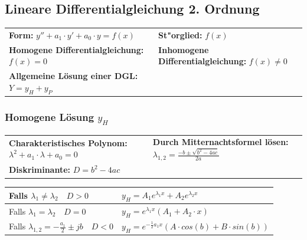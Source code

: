 \subsection{Lineare Differentialgleichung 2. Ordnung}
\renewcommand{\arraystretch}{1.2}
\begin{tabular}{p{8cm}p{8cm}}
	\textbf{Form:} $y''+a_1\cdot y'+a_0\cdot y=f(x)$  &
	\textbf{St"orglied:} $f(x)$\\
	\textbf{Homogene Differentialgleichung:} $f(x)=0$ &
	\textbf{Inhomogene Differentialgleichung:} $f(x)\neq 0$\\
	\textbf{Allgemeine Lösung einer DGL: }	$Y=y_H+y_P$& \\
\end{tabular}

\subsubsection{Homogene Lösung $y_H$}
\begin{tabular}{p{8cm}p{8cm}}
	\textbf{Charakteristisches Polynom:}\newline
	$\lambda^2+a_1\cdot\lambda+a_0=0$&	
	\textbf{Durch Mitternachtsformel lösen: }\newline
	$\lambda_{1,2}={\frac {-b\pm {\sqrt {b^{2}-4ac}}}{2a}}$\\
	\textbf{Diskriminante: }\newline
	$D = b^2-4ac $&\\
\end{tabular}

\begin{tabular}{|p{6cm}|p{8cm}|}
	\hline
	Falls $ \lambda_1\neq \lambda_2 \quad D > 0$&
	$y_H=A_1e^{\lambda_1x}+A_2e^{\lambda_2x}$\\
	\hline
	Falls $\lambda_1= \lambda_2 \quad D = 0$&
	$y_H=e^{\lambda_1x}(A_1+A_2\cdot x)$\\
	\hline
	Falls $\lambda_{1,2}= -\frac{a_1}{2} \pm jb \quad D < 0$&
	$y_H=e^{-\frac{1}{2}a_1x}(A \cdot cos(b) +B \cdot sin(b))$\\
	\hline
\end{tabular}

